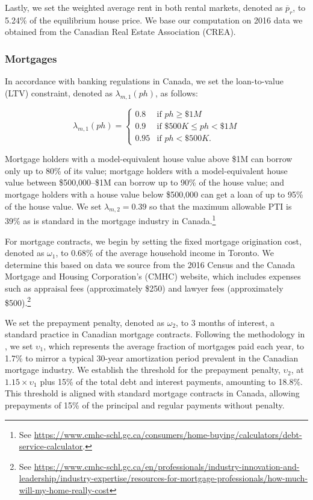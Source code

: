\documentclass[parskip=full]{article}
\begin{document}
Lastly, we set the weighted average rent in both rental markets, denoted as $\overline{p}_{r}$, to 5.24\% of the equilibrium house price. We base our computation on 2016 data we obtained from the Canadian Real Estate Association (CREA).

\subsubsection{Mortgages}

In accordance with banking regulations in Canada, we set the loan-to-value (LTV) constraint, denoted as $\lambda_{m,1}(ph)$, as follows:

\begin{equation*}
\lambda_{m,1}(ph) = \begin{cases}
0.8 &\text{if $ph\geq \$1M$}\\
0.9 &\text{if $\$500K\leq ph< \$1M$}\\
0.95 &\text{if $ph < \$500K$}.
\end{cases}
\end{equation*}

\noindent Mortgage holders with a model-equivalent house value above \$1M can borrow only up to 80\% of its value; mortgage holders with a model-equivalent house value between \$500,000--\$1M can borrow up to 90\% of the house value; and mortgage holders with a house value below \$500,000 can get a loan of up to 95\% of the house value. We set $\lambda_{m,2}=0.39$ so that the maximum allowable PTI is 39\% as is standard in the mortgage industry in Canada.\footnote{See \url{https://www.cmhc-schl.gc.ca/consumers/home-buying/calculators/debt-service-calculator}.}

For mortgage contracts, we begin by setting the fixed mortgage origination cost, denoted as $\omega_{1}$, to 0.68\% of the average household income in Toronto. We determine this based on data we source from the 2016 Census and the Canada Mortgage and Housing Corporation's (CMHC) website, which includes expenses such as appraisal fees (approximately \$250) and lawyer fees (approximately \$500).\footnote{See \url{https://www.cmhc-schl.gc.ca/en/professionals/industry-innovation-and-leadership/industry-expertise/resources-for-mortgage-professionals/how-much-will-my-home-really-cost}}

We set the prepayment penalty, denoted as $\omega_{2}$, to 3 months of interest, a standard practice in Canadian mortgage contracts. Following the methodology in \citet{kkk-2021}, we set $\upsilon_{1}$, which represents the average fraction of mortgages paid each year, to 1.7\% to mirror a typical 30-year amortization period prevalent in the Canadian mortgage industry. We establish the threshold for the prepayment penalty, $\upsilon_{2}$, at $1.15 \times \upsilon_{1}$ plus 15\% of the total debt and interest payments, amounting to 18.8\%. This threshold is aligned with standard mortgage contracts in Canada, allowing prepayments of 15\% of the principal and regular payments without penalty.
\end{document}
